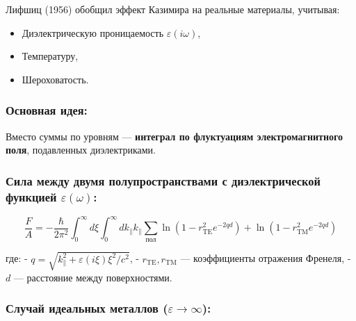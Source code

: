 \documentclass[11pt]{article}
\providecommand{\tightlist}{%
      \setlength{\itemsep}{0pt}\setlength{\parskip}{0pt}}
\begin{document}
Лифшиц (1956) обобщил эффект Казимира на реальные материалы, учитывая:

\begin{itemize}
\tightlist
\item
  Диэлектрическую проницаемость \(\varepsilon(i\omega)\),
\item
  Температуру,
\item
  Шероховатость.
\end{itemize}

\subsubsection{Основная
идея:}\label{ux43eux441ux43dux43eux432ux43dux430ux44f-ux438ux434ux435ux44f}

Вместо суммы по уровням --- \textbf{интеграл по флуктуациям
электромагнитного поля}, подавленных диэлектриками.

\subsubsection{\texorpdfstring{Сила между двумя полупространствами с
диэлектрической функцией
\(\varepsilon(\omega)\):}{Сила между двумя полупространствами с диэлектрической функцией \textbackslash{}varepsilon(\textbackslash{}omega):}}\label{ux441ux438ux43bux430-ux43cux435ux436ux434ux443-ux434ux432ux443ux43cux44f-ux43fux43eux43bux443ux43fux440ux43eux441ux442ux440ux430ux43dux441ux442ux432ux430ux43cux438-ux441-ux434ux438ux44dux43bux435ux43aux442ux440ux438ux447ux435ux441ux43aux43eux439-ux444ux443ux43dux43aux446ux438ux435ux439-varepsilonomega}

\[
\frac{F}{A} = -\frac{\hbar}{2\pi^2} \int_0^\infty d\xi \int_0^\infty dk_\parallel k_\parallel \sum_{\text{пол}} \ln\left(1 - r_\text{TE}^2 e^{-2q d} \right) + \ln\left(1 - r_\text{TM}^2 e^{-2q d} \right)
\]

где: - \(q = \sqrt{k_\parallel^2 + \varepsilon(i\xi)\xi^2/c^2}\), -
\(r_{\text{TE}}, r_{\text{TM}}\) --- коэффициенты отражения Френеля, -
\(d\) --- расстояние между поверхностями.

\subsubsection{\texorpdfstring{Случай идеальных металлов
(\(\varepsilon \to \infty\)):}{Случай идеальных металлов (\textbackslash{}varepsilon \textbackslash{}to \textbackslash{}infty):}}\label{ux441ux43bux443ux447ux430ux439-ux438ux434ux435ux430ux43bux44cux43dux44bux445-ux43cux435ux442ux430ux43bux43bux43eux432-varepsilon-to-infty}
\end{document}
